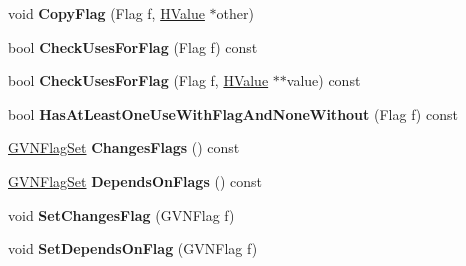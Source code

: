 \begin{DoxyCompactItemize}
\item 
void {\bfseries Copy\+Flag} (Flag f, \hyperlink{classv8_1_1internal_1_1_h_value}{H\+Value} $\ast$other)\hypertarget{classv8_1_1internal_1_1_h_value_a757b5f5801a6aa346e3427e2f3bda83f}{}\label{classv8_1_1internal_1_1_h_value_a757b5f5801a6aa346e3427e2f3bda83f}

\item 
bool {\bfseries Check\+Uses\+For\+Flag} (Flag f) const \hypertarget{classv8_1_1internal_1_1_h_value_a5354d77b3f1e58c8343fade63c628560}{}\label{classv8_1_1internal_1_1_h_value_a5354d77b3f1e58c8343fade63c628560}

\item 
bool {\bfseries Check\+Uses\+For\+Flag} (Flag f, \hyperlink{classv8_1_1internal_1_1_h_value}{H\+Value} $\ast$$\ast$value) const \hypertarget{classv8_1_1internal_1_1_h_value_a2d8c9f81670f39de49a5648804a0fed9}{}\label{classv8_1_1internal_1_1_h_value_a2d8c9f81670f39de49a5648804a0fed9}

\item 
bool {\bfseries Has\+At\+Least\+One\+Use\+With\+Flag\+And\+None\+Without} (Flag f) const \hypertarget{classv8_1_1internal_1_1_h_value_ab00d27f5b0a7c4bd4d5afead95d72a7c}{}\label{classv8_1_1internal_1_1_h_value_ab00d27f5b0a7c4bd4d5afead95d72a7c}

\item 
\hyperlink{classv8_1_1internal_1_1_enum_set}{G\+V\+N\+Flag\+Set} {\bfseries Changes\+Flags} () const \hypertarget{classv8_1_1internal_1_1_h_value_a684ce4b2cfe10ce46a1e9448b1910df6}{}\label{classv8_1_1internal_1_1_h_value_a684ce4b2cfe10ce46a1e9448b1910df6}

\item 
\hyperlink{classv8_1_1internal_1_1_enum_set}{G\+V\+N\+Flag\+Set} {\bfseries Depends\+On\+Flags} () const \hypertarget{classv8_1_1internal_1_1_h_value_a09d654cd1140b559e210ece25be857f0}{}\label{classv8_1_1internal_1_1_h_value_a09d654cd1140b559e210ece25be857f0}

\item 
void {\bfseries Set\+Changes\+Flag} (G\+V\+N\+Flag f)\hypertarget{classv8_1_1internal_1_1_h_value_a0f836c72d478f9036cc77f53a0b61758}{}\label{classv8_1_1internal_1_1_h_value_a0f836c72d478f9036cc77f53a0b61758}

\item 
void {\bfseries Set\+Depends\+On\+Flag} (G\+V\+N\+Flag f)\hypertarget{classv8_1_1internal_1_1_h_value_aeb16dbd964c886fc3864d6d8f15c8068}{}\label{classv8_1_1internal_1_1_h_value_aeb16dbd964c886fc3864d6d8f15c8068}


\end{DoxyCompactItemize}
